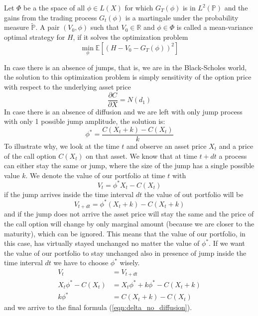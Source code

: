 \documentclass[times, utf8, diplomski]{fer}
\begin{document}
\begin{definition} \label{def:mean_variance_hedge}
	Let $\Phi$ be a the space of all $\phi \in L(X)$ for which $G_T(\phi)$ is in $L^2(\mathbb{P})$ and the gains from the trading process $G_t(\phi)$ is a martingale under the probability measure $\tilde{\mathbb{P}}$. A pair $(V_0, \phi)$ such that $V_0 \in \mathbb{R}$ and $\phi \in \Phi$ is called a mean-variance optimal strategy for $H$, if it solves the optimization problem 
	\begin{equation} \label{eqn:min_hedge_error}
		\min_{\phi}\mathbb{E}\left[ (H - V_0 - G_T(\phi))^2 \right]
	\end{equation}
\end{definition}
\noindent In case there is an absence of jumps, that is, we are in the Black-Scholes world, the solution to this optimization problem is simply sensitivity of the option price with respect to the underlying asset price
\begin{equation*}
	\frac{\partial C}{\partial X} = N(d_1)
\end{equation*}
In case there is an absence of diffusion and we are left with only jump process with only 1 possible jump amplitude, the solution is:
\begin{equation} \label{eqn:delta_no_diffusion}
	\phi^* = \frac{C(X_t + k) - C(X_t)}{k}
\end{equation}
To illustrate why, we look at the time $t$ and observe an asset price $X_t$ and a price of the call option $C(X_t)$ on that asset. We know that at time $t+dt$ a process can either stay the same or jump, where the size of the jump has a single possible value $k$. We denote the value of our portfolio at time $t$ with $$V_t = \phi^* X_t - C(X_t)$$ if the jump arrives inside the time interval $dt$ the value of out portfolio will be
$$V_{t+dt} = \phi^* (X_t + k) - C(X_t + k)$$
and if the jump does not arrive the asset price will stay the same and the price of the call option will change by only marginal amount (because we are closer to the maturity), which can be ignored. This means that the value of our portfolio, in this case, has virtually stayed unchanged no matter the value of $\phi^*$. If we want the value of our portfolio to stay unchanged also in presence of jump inside the time interval $dt$ we have to choose $\phi^*$ wisely.
\begin{align*}
	V_t &= V_{t+dt} \\
	X_t\phi^* - C(X_t) &=  X_t\phi^*+ k\phi^* - C(X_t + k) \\
	k\phi^* &= C(X_t + k) - C(X_t)
\end{align*} and we arrive to the final formula (\ref{eqn:delta_no_diffusion}).
\end{document}
